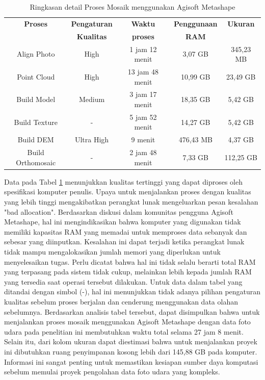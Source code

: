 \begin{table}[H]
\centering
\caption{Ringkasan detail Proses Mosaik menggunakan Agisoft Metashape}
\begin{tabular}{|c|c|c|c|c|}
\hline
\textbf{Proses} & \textbf{Pengaturan} & \textbf{Waktu} & \textbf{Penggunaan} & \textbf{Ukuran} \\
 & \textbf{Kualitas} & \textbf{proses} & \textbf{RAM} & \\
\hline
Align Photo & High & 1 jam 12 menit & 3,07 GB & 345,23 MB \\
\hline
Point Cloud & High & 13 jam 48 menit & 10,99 GB & 23,49 GB \\
\hline
Build Model & Medium & 3 jam 17 menit & 18,35 GB & 5,42 GB \\
\hline
Build Texture & - & 5 jam 52 menit & 14,27 GB & 5,42 GB \\
\hline
Build DEM & Ultra High & 9 menit & 476,43 MB & 4,37 GB \\
\hline
Build Orthomosaic & - & 2 jam 48 menit & 7,33 GB & 112,25 GB \\
\hline
\end{tabular}
\label{tabel hasil agisoft}
\end{table}

\par Data pada Tabel \ref{tabel hasil agisoft} menunjukkan kualitas tertinggi yang dapat diproses oleh spesifikasi komputer penulis. Upaya untuk menjalankan proses dengan kualitas yang lebih tinggi mengakibatkan perangkat lunak mengeluarkan pesan kesalahan "bad allocation". Berdasarkan diskusi dalam komunitas pengguna Agisoft Metashape, hal ini mengindikasikan bahwa komputer yang digunakan tidak memiliki kapasitas RAM yang memadai untuk memproses data sebanyak dan sebesar yang diinputkan. Kesalahan ini dapat terjadi ketika perangkat lunak tidak mampu mengalokasikan jumlah memori yang diperlukan untuk menyelesaikan tugas. Perlu dicatat bahwa hal ini tidak selalu berarti total RAM yang terpasang pada sistem tidak cukup, melainkan lebih kepada jumlah RAM yang tersedia saat operasi tersebut dilakukan. Untuk data dalam tabel yang ditandai dengan simbol (-), hal ini menunjukkan tidak adanya pilihan pengaturan kualitas sebelum proses berjalan dan cenderung menggunakan data olahan sebelumnya. Berdasarkan analisis tabel tersebut, dapat disimpulkan bahwa untuk menjalankan proses mosaik menggunakan Agisoft Metashape dengan data foto udara pada penelitian ini membutuhkan waktu total selama 27 jam 8 menit. Selain itu, dari kolom ukuran dapat diestimasi bahwa untuk menjalankan proyek ini dibutuhkan ruang penyimpanan kosong lebih dari 145,88 GB pada komputer. Informasi ini sangat penting untuk memastikan kesiapan sumber daya komputasi sebelum memulai proyek pengolahan data foto udara yang kompleks.

